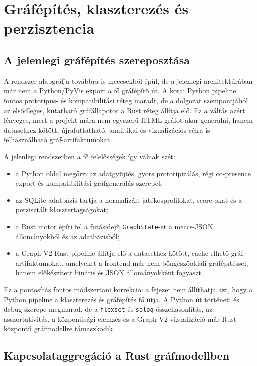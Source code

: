 ﻿\documentclass[a4paper,12pt]{report}
\begin{document}
\chapter{Gráfépítés, klaszterezés és perzisztencia}

\section{A jelenlegi gráfépítés szereposztása}

A rendszer alapgráfja továbbra is meccsekből épül, de a jelenlegi architektúrában már nem a Python/PyVis export a fő gráfépítő út. A korai Python pipeline fontos prototípus- és kompatibilitási réteg maradt, de a dolgozat szempontjából az elsődleges, kutatható gráfállapotot a Rust réteg állítja elő. Ez a váltás azért lényeges, mert a projekt mára nem egyszerű HTML-gráfot akar generálni, hanem datasethez kötött, újrafuttatható, analitikai és vizualizációs célra is felhasználható gráf-artifaktumokat.

A jelenlegi rendszerben a fő felelősségek így válnak szét:

\begin{itemize}
    \item a Python oldal megőrzi az adatgyűjtés, gyors prototipizálás, régi co-presence export és kompatibilitási gráfgenerálás szerepét;
    \item az SQLite adatbázis tartja a normalizált játékosprofilokat, score-okat és a perzisztált klasztertagságokat;
    \item a Rust motor építi fel a futásidejű \texttt{GraphState}-et a meccs-JSON állományokból és az adatbázisból;
    \item a Graph V2 Rust pipeline állítja elő a datasethez kötött, cache-elhető gráf-artifaktumokat, amelyeket a frontend már nem böngészőoldali gráfépítéssel, hanem előkészített bináris és JSON állományokként fogyaszt.
\end{itemize}

Ez a pontosítás fontos módszertani korrekció: a fejezet nem állíthatja azt, hogy a Python pipeline a klaszterezés és gráfépítés fő útja. A Python út történeti és debug-szerepe megmarad, de a \texttt{flexset} és \texttt{soloq} összehasonlítás, az asszortativitás, a központisági elemzés és a Graph V2 vizualizáció már Rust-központú gráfmodellre támaszkodik.

\section{Kapcsolataggregáció a Rust gráfmodellben}
\end{document}
